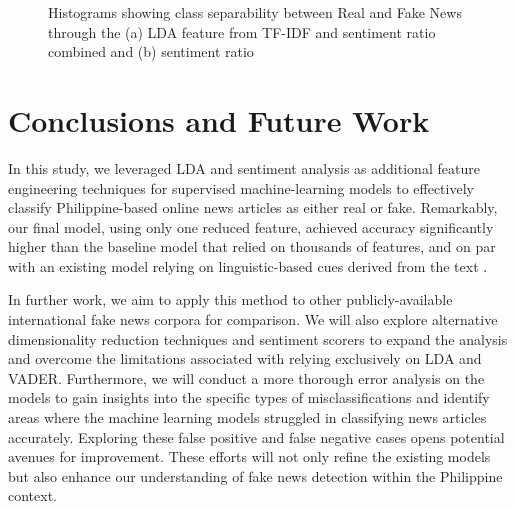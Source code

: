 \documentclass[10pt,a4paper,twoside]{article}
\begin{document}
\begin{figure}[h!]
    \centering
    \qquad
    \caption{Histograms showing class separability between Real and Fake News  through the (a) LDA feature from TF-IDF and sentiment ratio combined and (b) sentiment ratio}%
    \label{fig:example}%
\end{figure}

\section{Conclusions and Future Work}
In this study, we leveraged LDA and sentiment analysis as additional feature engineering techniques for supervised machine-learning models to effectively classify Philippine-based online news articles as either real or fake. Remarkably, our final model, using only one reduced feature, achieved accuracy significantly higher than the baseline model that relied on thousands of features, and on par with an existing model relying on linguistic-based cues derived from the text \cite{Fernandez}. 

 In further work, we aim to apply this method to other publicly-available international fake news corpora for comparison. We will also explore alternative dimensionality reduction techniques and sentiment scorers to expand the analysis and overcome the limitations associated with relying exclusively on LDA and VADER.  Furthermore, we will conduct a more thorough error analysis on the models to gain insights into the specific types of misclassifications and identify areas where the machine learning models struggled in classifying news articles accurately. Exploring these false positive and false negative cases opens potential avenues for improvement. These efforts will not only refine the existing models but also enhance our understanding of fake news detection within the Philippine context.\vspace{-0.5em}



\end{document}

